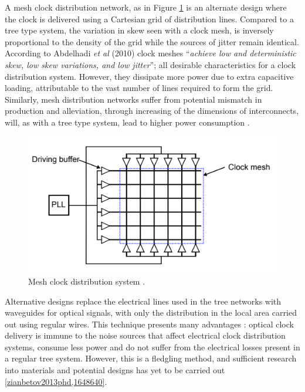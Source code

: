 A mesh clock distribution network, as in Figure \ref{fig:mesh} is an alternate design where the clock is delivered using a Cartesian grid of distribution lines. Compared to a tree type system, the variation in skew seen with a clock mesh, is inversely proportional to the density of the grid while the sources of jitter remain identical. According to Abdelhadi \textit{et al} (2010) clock meshes ``\textit{achieve low and deterministic skew, low skew variations, and low jitter}''; all desirable characteristics for a clock distribution system. However, they dissipate more power due to extra capacitive loading, attributable to the vast number of lines required to form the grid. Similarly, mesh distribution networks suffer from potential mismatch in production and alleviation, through increasing of the dimensions of interconnects, will, as with a tree type system, lead to higher power consumption \cite{abdelhadi2010timing}. 
\begin{figure}[h]
	\centering
	\includegraphics[scale=0.7]{../tex_files/eldar_mesh}
	\caption[Mesh clock distribution system ]{Mesh clock distribution system \cite{zianbetov2013phd}.}
	\label{fig:mesh}
\end{figure}

Alternative designs replace the electrical lines used in the tree networks with waveguides for optical signals, with only the distribution in the local area carried out using regular wires. This technique presents many advantages \cite{chen2006chip}: optical clock delivery is immune to the noise sources that affect electrical clock distribution systems, consume less power and do not suffer from the electrical losses present in a regular tree system. However, this is a fledgling method, and sufficient research into materials and potential designs has yet to be carried out \ref{zianbetov2013phd,1648640}.

